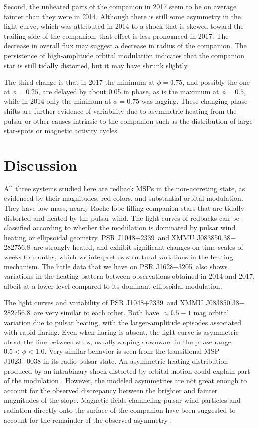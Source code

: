 \documentclass[iop]{emulateapj}
\newcommand{\mspone}{PSR J1628$-$3205}
\newcommand{\msptwo}{PSR J1048$+$2339}
\newcommand{\mspthree}{XMMU J083850.38$-$282756.8}
\begin{document}
Second, the unheated parts of the companion in 2017 seem to be on average
fainter than they were in 2014.  Although there is still some asymmetry in the
light curve, which was attributed in 2014 to a shock that is skewed toward the
trailing side of the companion, that effect is less pronounced in 2017.
The decrease in overall flux may suggest a decrease in radius of the companion.
The persistence of high-amplitude orbital modulation indicates that the
companion star is still tidally distorted, but it may have shrunk slightly.

The third change is that in 2017 the minimum at $\phi=0.75$,
and possibly the one at $\phi=0.25$, are delayed by about 0.05 in phase,
as is the maximum at $\phi=0.5$, while in 2014 only the minimum at
$\phi=0.75$ was lagging.
These changing phase shifts are further evidence of variability due to
asymmetric heating from the pulsar or other causes intrinsic to the companion
such as the distribution of large star-spots or magnetic activity cycles.

\section{Discussion}

All three systems studied here are redback MSPs in the non-accreting state,
as evidenced by their magnitudes, red colors, and substantial orbital
modulation.  They have low-mass, nearly Roche-lobe filling
companion stars that are tidally distorted and heated by the pulsar wind.
The light curves of redbacks can be classified according to whether
the modulation is dominated by pulsar wind heating or ellipsoidal geometry.
\msptwo\ and \mspthree\ are strongly heated, and exhibit significant changes
on time scales of weeks to months, which we interpret as structural variations
in the heating mechanism.  The little data that we have on \mspone\ also
shows variations in the heating pattern between observations obtained in
2014 and 2017, albeit at a lower level compared to its dominant
ellipsoidal modulation.

The light curves and variability of \msptwo\ and \mspthree\ are very
similar to each other.
Both have $\approx0.5-1$ mag orbital variation due to pulsar heating,
with the larger-amplitude episodes associated with rapid flaring.
Even when flaring is absent, the light curve is asymmetric about
the line between stars, usually sloping downward in the phase range
$0.5<\phi<1.0$. Very similar behavior \citep{wou04,tho05}
is seen from the transitional MSP J1023+0038 in its radio-pulsar state.
An asymmetric heating distribution produced by
an intrabinary shock distorted by orbital motion
could explain part of the modulation \citep{rom16b}. However, the
modeled asymmetries are not great enough to account for the observed
discrepancy between the brighter and fainter magnitudes of the slope.
Magnetic fields channeling pulsar wind particles and radiation directly
onto the surface of the companion have been suggested to account for
the remainder of the observed asymmetry \citep{li14,tan14,san17}. 
\end{document}
